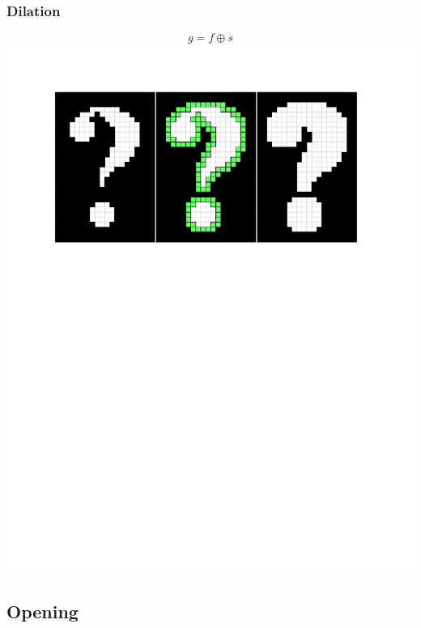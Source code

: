 \documentclass{beamer}
\begin{document}
\begin{frame}
\frametitle{Dilation}
\begin{center}
\begin{equation*}
g = f \oplus s
\end{equation*}
\includegraphics[width=1\textwidth,trim={0 0 0 0.5in},clip]{dilation}
\end{center}
\end{frame}

\subsection[Opening]{Opening}
\end{document}
